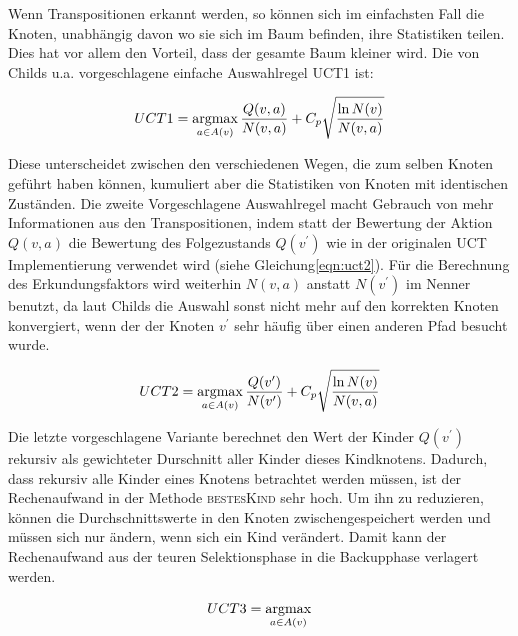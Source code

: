 Wenn Transpositionen erkannt werden, so können sich im einfachsten Fall die Knoten, unabhängig davon wo sie sich im Baum befinden, ihre Statistiken teilen. Dies hat vor allem den Vorteil, dass der gesamte Baum kleiner wird. Die von Childs u.a. vorgeschlagene einfache Auswahlregel UCT1 ist:

\begin{equation}
UCT1 = \operatorname*{argmax}_{a \in A(v)} \frac{Q(v,a)}{N(v,a)} + C_p\sqrt{\frac{\ln N(v)}{N(v,a)}}
\label{eqn:UCT1}
\end{equation}

Diese unterscheidet zwischen den verschiedenen Wegen, die zum selben Knoten geführt haben können, kumuliert aber die Statistiken von Knoten mit identischen Zuständen. Die zweite Vorgeschlagene Auswahlregel macht Gebrauch von mehr Informationen aus den Transpositionen, indem statt der Bewertung der Aktion $Q(v,a)$ die Bewertung des Folgezustands $Q(v^\prime)$ wie in der originalen UCT Implementierung verwendet wird (siehe Gleichung\~\ref{eqn:uct2}). Für die Berechnung des Erkundungsfaktors wird weiterhin $N(v,a)$ anstatt $N(v^\prime)$ im Nenner benutzt, da laut Childs die Auswahl sonst nicht mehr auf den korrekten Knoten konvergiert, wenn der der Knoten $v^\prime$ sehr häufig über einen anderen Pfad besucht wurde.

\begin{equation}
UCT2 = \operatorname*{argmax}_{a \in A(v)} \frac{Q(v^\prime)}{N(v^\prime)} + C_p\sqrt{\frac{\ln N(v)}{N(v,a)}}
\label{eqn:UCT2}
\end{equation}

Die letzte vorgeschlagene Variante berechnet den Wert der Kinder $Q(v^\prime)$ rekursiv als gewichteter Durschnitt aller Kinder dieses Kindknotens. Dadurch, dass rekursiv alle Kinder eines Knotens betrachtet werden müssen, ist der Rechenaufwand in der Methode \textsc{bestesKind} sehr hoch. Um ihn zu reduzieren, können die Durchschnittswerte in den Knoten zwischengespeichert werden und müssen sich nur ändern, wenn sich ein Kind verändert. Damit kann der Rechenaufwand aus der teuren Selektionsphase in die Backupphase verlagert werden.

\begin{equation}
UCT3 = \operatorname*{argmax}_{a \in A(v)}
\label{eqn:uct3}
\end{equation}

